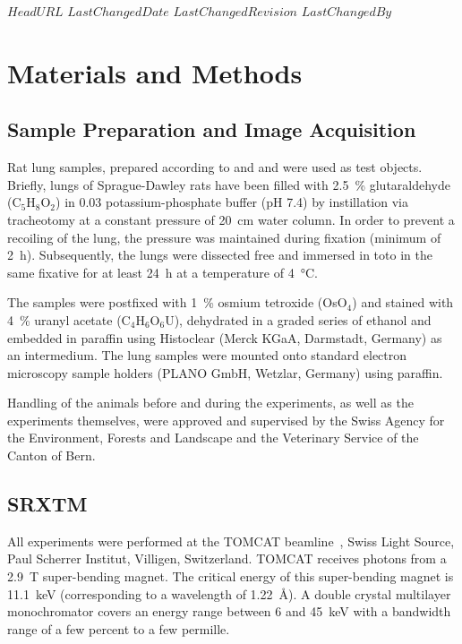 \svnidlong
{$HeadURL$}
{$LastChangedDate$}
{$LastChangedRevision$}
{$LastChangedBy$}

\ifhtml
\else
\begin{center}
\end{center}
\fi

\section{Materials and Methods}%
\label{sec:materials and methods}%
\subsection{Sample Preparation and Image Acquisition}%
Rat lung samples, prepared according to %
\ifhtml
	\citet{Tschanz2002} and \citet{Schittny1997}
\else
	 and 
\fi%
were used as test objects. Briefly, lungs of Sprague-Dawley rats have been filled with \SI{2.5}{\percent} glutaraldehyde (C$_5$H$_8$O$_2$) in \SI{0.03}{\Molar} potassium-phosphate buffer (pH 7.4) by instillation via tracheotomy at a constant pressure of \SI{20}{\centi\meter} water column. In order to prevent a recoiling of the lung, the pressure was maintained during fixation (minimum of \SI{2}{\hour}). Subsequently, the lungs were dissected free and immersed in toto in the same fixative for at least \SI{24}{\hour} at a temperature of \SI{4}{\celsius}.

The samples were postfixed with \SI{1}{\percent} osmium tetroxide (OsO$_4$) and stained with \SI{4}{\percent} uranyl acetate (C$_4$H$_6$O$_6$U), dehydrated in a graded series of ethanol and embedded in paraffin using Histoclear (Merck KGaA, Darmstadt, Germany) as an intermedium. The lung samples were mounted onto standard electron microscopy sample holders (PLANO GmbH, Wetzlar, Germany) using paraffin.

Handling of the animals before and during the experiments, as well as the experiments themselves, were approved and supervised by the Swiss Agency for the Environment, Forests and Landscape and the Veterinary Service of the Canton of Bern.

\subsection{SRXTM}%
All experiments were performed at the TOMCAT beamline~\cite{Stampanoni2006a}, Swiss Light Source, Paul Scherrer Institut, Villigen, Switzerland. TOMCAT receives photons from a \SI{2.9}{\tesla} super-bending magnet. The critical energy of this super-bending magnet is \SI{11.1}{\kilo\electronvolt} (corresponding to a wavelength of \SI{1.22}{\angstrom}). A double crystal multilayer monochromator covers an energy range between 6 and \SI{45}{\kilo\electronvolt} with a bandwidth range of a few percent to a few permille.

